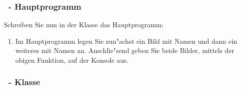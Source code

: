 \begin{frame}%
  \frametitle{\theexercise\ - Hauptprogramm}%

Schreiben Sie nun in der Klasse  das Hauptprogramm:
\begin{enumerate}
\item Im Hauptprogramm legen Sie zun"achst ein Bild mit Namen  und dann ein weiteres mit Namen  an.
  Anschlie"send geben Sie beide Bilder, mittels der \mbox{obigen}  Funktion, auf der Konsole aus.
\end{enumerate}
\pause
  \frametitle{\theexercise\ - Klasse  }%

\end{frame}
